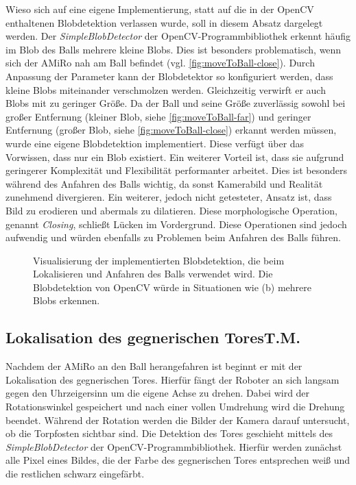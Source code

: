 Wieso sich auf eine eigene Implementierung, statt auf die in der OpenCV enthaltenen Blobdetektion verlassen wurde, soll in diesem Absatz dargelegt werden.
Der \textit{SimpleBlobDetector} der OpenCV-Programmbibliothek erkennt häufig im Blob des Balls mehrere kleine Blobs. Dies ist besonders problematisch, wenn sich der AMiRo nah am Ball befindet (vgl. \ref{fig:moveToBall-close}).
Durch Anpassung der Parameter kann der Blobdetektor so konfiguriert werden, dass kleine Blobs miteinander verschmolzen werden.
Gleichzeitig verwirft er auch Blobs mit zu geringer Größe. Da der Ball und seine Größe zuverlässig sowohl bei großer Entfernung (kleiner Blob, siehe \ref{fig:moveToBall-far}) und geringer Entfernung (großer Blob, siehe \ref{fig:moveToBall-close}) erkannt werden müssen, wurde eine eigene Blobdetektion implementiert. Diese verfügt über das Vorwissen, dass nur ein Blob existiert. Ein weiterer Vorteil ist, dass sie aufgrund geringerer Komplexität und Flexibilität performanter arbeitet. Dies ist besonders während des Anfahren des Balls wichtig, da sonst Kamerabild und Realität zunehmend divergieren.
Ein weiterer, jedoch nicht getesteter, Ansatz ist, dass Bild zu erodieren und abermals zu dilatieren. Diese morphologische Operation, genannt \textit{Closing}, schließt Lücken im Vordergrund. Diese Operationen sind jedoch aufwendig und würden ebenfalls zu Problemen beim Anfahren des Balls führen.

\begin{figure}
	\caption{Visualisierung der implementierten Blobdetektion, die beim Lokalisieren und Anfahren des Balls verwendet wird. Die Blobdetektion von OpenCV würde in Situationen wie (b) mehrere Blobs erkennen.}
	\label{fig:moveToBall}
\end{figure}

\subsection[Lokalisation des gegnerischen Tores]{Lokalisation des gegnerischen Tores\hfill {\normalsize T.M.}} %

Nachdem der AMiRo an den Ball herangefahren ist beginnt er mit der Lokalisation des gegnerischen Tores. 
Hierfür fängt der Roboter an sich langsam gegen den Uhrzeigersinn um die eigene Achse zu drehen. Dabei wird der Rotationswinkel gespeichert und nach einer vollen Umdrehung wird die Drehung beendet. 
Während der Rotation werden die Bilder der Kamera darauf untersucht, ob die Torpfosten sichtbar sind. Die Detektion des Tores geschieht mittels des \textit{SimpleBlobDetector} der OpenCV-Programmbibliothek. Hierfür werden zunächst alle Pixel eines Bildes, die der Farbe des gegnerischen Tores entsprechen weiß und die restlichen schwarz eingefärbt.

